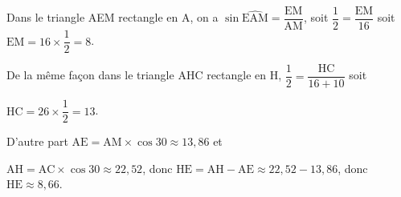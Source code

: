 \documentclass[10pt]{article}
\begin{document}
\medskip
%
%
%
%
%
%
%
%


%
Dans le triangle AEM rectangle en A, on a $\sin \widehat{\text{EAM}} = \dfrac{\text{EM}}{\text{AM}}$, soit $\dfrac{1}{2} = \dfrac{\text{EM}}{16}$ soit $\text{EM} = 16 \times \dfrac{1}{2} = 8$.

De la même façon dans le triangle AHC rectangle en H, $\dfrac{1}{2} = \dfrac{\text{HC}}{16+10}$ soit 

$\text{HC} = 26 \times \dfrac{1}{2} = 13$.

D'autre part $\text{AE} = \text{AM} \times\cos 30 \approx 13,86$ et 

$\text{AH} = \text{AC} \times\cos 30 \approx 22,52$, donc $\text{HE} = \text{AH} - \text{AE} \approx 22,52 - 13,86$, donc  $\text{HE} \approx 8,66$.

\bigskip
\end{document}
